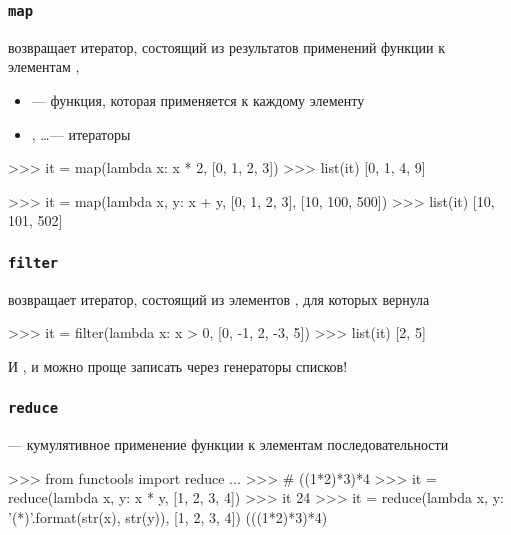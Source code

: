 \documentclass[fleqn, xcolor=x11names]{beamer}
\begin{document}
\begin{frame}[fragile]\frametitle{\texttt{map}}
 возвращает итератор, состоящий из результатов применений функции  к элементам ,  

\begin{itemize}
\item {} --- функция, которая применяется к каждому элементу 
\item {},  \ldots  --- итераторы
\end{itemize}

\begin{pcode}
>>> it = map(lambda x: x * 2, [0, 1, 2, 3])
>>> list(it)
[0, 1, 4, 9]
\end{pcode}

\begin{pcode}
>>> it = map(lambda x, y: x + y, [0, 1, 2, 3], [10, 100, 500])
>>> list(it)
[10, 101, 502]
\end{pcode}

\end{frame}

\begin{frame}[fragile]\frametitle{\texttt{filter}}
 возвращает итератор, состоящий из элементов , для которых  вернула 

\begin{pcode}
>>> it = filter(lambda x: x > 0, [0, -1, 2, -3, 5])
>>> list(it)
[2, 5]
\end{pcode}

\hfill

И , и  можно проще записать через генераторы списков!
\end{frame}

\begin{frame}[fragile]\frametitle{\texttt{reduce}}

 --- кумулятивное применение функции  к элементам последовательности 

\begin{pcode}
>>> from functools import reduce
...
>>> # ((1*2)*3)*4
>>> it = reduce(lambda x, y: x * y, [1, 2, 3, 4]) 
>>> it
24 
>>> it = reduce(lambda x, y: '({}*{})'.format(str(x), str(y)),
                [1, 2, 3, 4])
(((1*2)*3)*4)
\end{pcode}
\end{frame}
\end{document}
